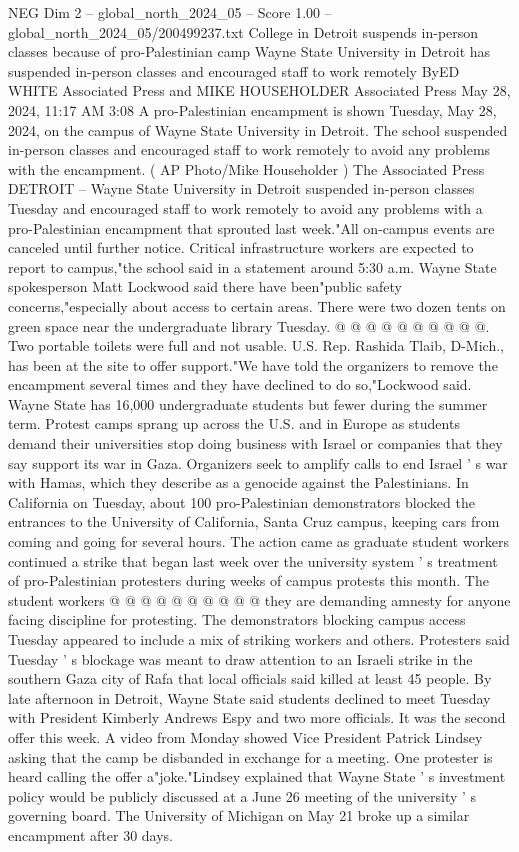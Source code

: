 \begin{textsample}{NEG Dim 2 – global\_north\_2024\_05 – Score 1.00 – global\_north\_2024\_05/200499237.txt}  \label{ex:f2_neg_058}
College in Detroit suspends in-person classes because of pro-Palestinian camp Wayne State University in Detroit has suspended in-person classes and encouraged staff to work remotely ByED WHITE Associated Press and MIKE HOUSEHOLDER Associated Press May 28, 2024, 11:17 AM 3:08 A pro-Palestinian encampment is shown Tuesday, May 28, 2024, on the campus of Wayne State University in Detroit.
The school suspended in-person classes and encouraged staff to work remotely to avoid any problems with the encampment. ( AP Photo/Mike Householder ) The Associated Press DETROIT -- Wayne State University in Detroit suspended in-person classes Tuesday and encouraged staff to work remotely to avoid any problems with a pro-Palestinian encampment that sprouted last week."All on-campus events are canceled until further notice.
Critical infrastructure workers are expected to report to campus,"the school said in a statement around 5:30 a.m.
Wayne State spokesperson Matt Lockwood said there have been"public safety concerns,"especially about access to certain areas.
There were two dozen tents on green space near the undergraduate library Tuesday. @ @ @ @ @ @ @ @ @ @.
Two portable toilets were full and not usable.
U.S.
Rep.
Rashida Tlaib, D-Mich., has been at the site to offer support."We have told the organizers to remove the encampment several times and they have declined to do so,"Lockwood said.
Wayne State has 16,000 undergraduate students but fewer during the summer term.
Protest camps sprang up across the U.S. and in Europe as students demand their universities stop doing business with Israel or companies that they say support its war in Gaza.
Organizers seek to amplify calls to end Israel ' s war with Hamas, which they describe as a genocide against the Palestinians.
In California on Tuesday, about 100 pro-Palestinian demonstrators blocked the entrances to the University of California, Santa Cruz campus, keeping cars from coming and going for several hours.
The action came as graduate student workers continued a strike that began last week over the university system ' s treatment of pro-Palestinian protesters during weeks of campus protests this month.
The student workers @ @ @ @ @ @ @ @ @ @ they are demanding amnesty for anyone facing discipline for protesting.
The demonstrators blocking campus access Tuesday appeared to include a mix of striking workers and others.
Protesters said Tuesday ' s blockage was meant to draw attention to an Israeli strike in the southern Gaza city of Rafa that local officials said killed at least 45 people.
By late afternoon in Detroit, Wayne State said students declined to meet Tuesday with President Kimberly Andrews Espy and two more officials.
It was the second offer this week.
A video from Monday showed Vice President Patrick Lindsey asking that the camp be disbanded in exchange for a meeting.
One protester is heard calling the offer a"joke."Lindsey explained that Wayne State ' s investment policy would be publicly discussed at a June 26 meeting of the university ' s governing board.
The University of Michigan on May 21 broke up a similar encampment after 30 days.

\end{textsample}
